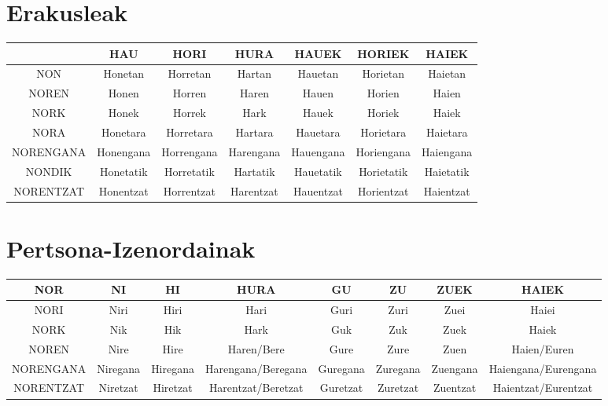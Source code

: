 \documentclass[12pt, a4paper, landscape]{article}
\begin{document}
\section{Erakusleak}
\begin{table}[h]
\begin{center}
\begin{tabular}{|c|c|c|c|c|c|c|}
\hline
& HAU & HORI & HURA & HAUEK & HORIEK & HAIEK \\
\hline
NON & Honetan & Horretan & Hartan & Hauetan & Horietan & Haietan \\
\hline
NOREN & Honen & Horren & Haren & Hauen & Horien & Haien \\
\hline
NORK & Honek & Horrek & Hark & Hauek & Horiek & Haiek \\
\hline
NORA & Honetara & Horretara & Hartara & Hauetara & Horietara & Haietara \\ 
\hline
NORENGANA & Honengana & Horrengana & Harengana & Hauengana & Horiengana & Haiengana \\
\hline
NONDIK & Honetatik & Horretatik & Hartatik & Hauetatik & Horietatik & Haietatik \\
\hline
NORENTZAT & Honentzat & Horrentzat & Harentzat & Hauentzat & Horientzat & Haientzat \\
\hline
\end{tabular}
\end{center}
\end{table}

\section{Pertsona-Izenordainak}
\begin{table}[h]
\begin{center}
\begin{tabular}{|c|c|c|c|c|c|c|c|}
\hline
NOR & NI & HI & HURA & GU & ZU & ZUEK & HAIEK \\ 
\hline
NORI & Niri & Hiri & Hari & Guri & Zuri & Zuei & Haiei \\
\hline
NORK & Nik & Hik & Hark & Guk & Zuk & Zuek & Haiek \\
\hline
NOREN & Nire & Hire & Haren/Bere & Gure & Zure & Zuen & Haien/Euren \\
\hline
NORENGANA & Niregana & Hiregana & Harengana/Beregana & Guregana & Zuregana & Zuengana & Haiengana/Eurengana \\
\hline
NORENTZAT & Niretzat & Hiretzat & Harentzat/Beretzat & Guretzat & Zuretzat & Zuentzat & Haientzat/Eurentzat \\
\hline
\end{tabular}
\end{center}
\end{table}
\end{document}
